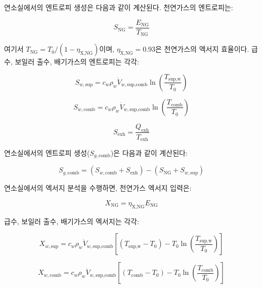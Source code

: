 \documentclass[final,5p,times,twocolumn,authoryear]{elsarticle}
\begin{document}
연소실에서의 엔트로피 생성은 다음과 같이 계산된다. 천연가스의 엔트로피는:

\begin{equation}
\label{eq:gb_s_ng}
S_{\text{NG}} = \frac{E_{\text{NG}}}{T_{\text{NG}}}
\end{equation}

여기서 $T_{\text{NG}} = T_0 / (1 - \eta_{\text{X,NG}})$이며, $\eta_{\text{X,NG}} = 0.93$은 천연가스의 엑서지 효율이다. 급수, 보일러 출수, 배기가스의 엔트로피는 각각:

\begin{equation}
\label{eq:gb_s_w_sup}
S_{w,\text{sup}} = c_w \rho_w \dot{V}_{w,\text{sup,comb}} \ln\left(\frac{T_{\text{sup,w}}}{T_0}\right)
\end{equation}

\begin{equation}
\label{eq:gb_s_w_comb}
S_{w,\text{comb}} = c_w \rho_w \dot{V}_{w,\text{sup,comb}} \ln\left(\frac{T_{\text{comb}}}{T_0}\right)
\end{equation}

\begin{equation}
\label{eq:gb_s_exh}
S_{\text{exh}} = \frac{Q_{\text{exh}}}{T_{\text{exh}}}
\end{equation}

연소실에서의 엔트로피 생성($S_{g,\text{comb}}$)은 다음과 같이 계산된다:

\begin{equation}
\label{eq:gb_sg_comb}
S_{g,\text{comb}} = (S_{w,\text{comb}} + S_{\text{exh}}) - (S_{\text{NG}} + S_{w,\text{sup}})
\end{equation}

연소실에서의 엑서지 분석을 수행하면, 천연가스 엑서지 입력은:

\begin{equation}
\label{eq:gb_x_ng}
X_{\text{NG}} = \eta_{\text{X,NG}} E_{\text{NG}}
\end{equation}

급수, 보일러 출수, 배기가스의 엑서지는 각각:

\begin{equation}
\label{eq:gb_x_w_sup}
X_{w,\text{sup}} = c_w \rho_w \dot{V}_{w,\text{sup,comb}} \left[(T_{\text{sup,w}} - T_0) - T_0 \ln\left(\frac{T_{\text{sup,w}}}{T_0}\right)\right]
\end{equation}

\begin{equation}
\label{eq:gb_x_w_comb}
X_{w,\text{comb}} = c_w \rho_w \dot{V}_{w,\text{sup,comb}} \left[(T_{\text{comb}} - T_0) - T_0 \ln\left(\frac{T_{\text{comb}}}{T_0}\right)\right]
\end{equation}
\end{document}
